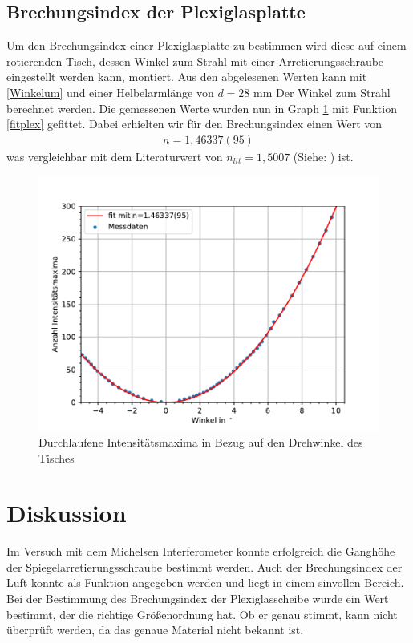 \documentclass[11pt, a4paper]{article}
\begin{document}
    \subsection{Brechungsindex der Plexiglasplatte}
    Um den Brechungsindex einer Plexiglasplatte zu bestimmen wird diese auf einem rotierenden Tisch, dessen Winkel zum Strahl mit einer Arretierungsschraube eingestellt werden kann, montiert.
    Aus den abgelesenen Werten kann mit \ref{Winkelum} und einer Helbelarmlänge von $d = 28$ mm Der Winkel zum Strahl berechnet werden.
    Die gemessenen Werte wurden nun in Graph \ref{fig:plexiplot} mit Funktion \ref{fitplex} gefittet. Dabei erhielten wir für den Brechungsindex einen Wert von
    \begin{align}
        n = 1,46337(95)
    \end{align}
    was vergleichbar mit dem Literaturwert von $n_{lit} = 1,5007$ (Siehe: \cite{refdat}) ist.
    \begin{figure}[!h]
        \centering
        \includegraphics[width=\textwidth]{./plots/plexi.pdf}

        \caption{Durchlaufene Intensitätsmaxima in Bezug auf den Drehwinkel des Tisches}
        \label{fig:plexiplot}
    \end{figure}

    \section{Diskussion}
    Im Versuch mit dem Michelsen Interferometer konnte erfolgreich die Ganghöhe der Spiegelarretierungsschraube bestimmt werden.
    Auch der Brechungsindex der Luft konnte als Funktion angegeben werden und liegt in einem sinvollen Bereich.
    Bei der Bestimmung des Brechungsindex der Plexiglasscheibe wurde ein Wert bestimmt, der die richtige Größenordnung hat. Ob er genau stimmt, kann nicht überprüft werden, da das genaue Material nicht bekannt ist.
    
    
\end{document}
